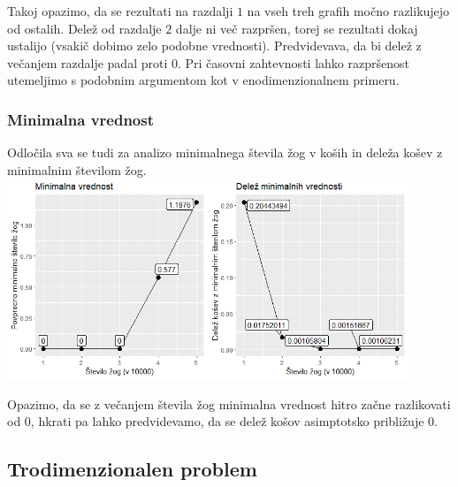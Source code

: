 \documentclass[a4paper, 11pt]{article}
\begin{document}
Takoj opazimo, da se rezultati na razdalji $1$ na vseh treh grafih močno razlikujejo od ostalih. Delež od razdalje $2$ dalje ni več razpršen, torej se rezultati dokaj ustalijo (vsakič dobimo zelo podobne vrednosti). Predvidevava, da bi delež
z večanjem razdalje padal proti 0.
Pri časovni zahtevnosti lahko razpršenost utemeljimo s podobnim argumentom kot v enodimenzionalnem primeru.
\\
\subsubsection{Minimalna vrednost}
Odločila sva se tudi za analizo minimalnega števila žog v koših in deleža košev z minimalnim številom žog.
\bigbreak
\includegraphics[width=12cm, height=6cm]{minimum.png}

Opazimo, da se z večanjem števila žog minimalna vrednost hitro začne razlikovati od 0, hkrati pa lahko predvidevamo, da se delež košov asimptotsko približuje $0$. 

\subsection{Trodimenzionalen problem}
\end{document}
